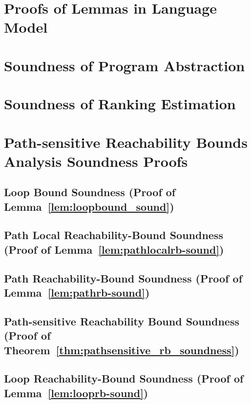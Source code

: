 \section{Proofs of Lemmas in Language Model}
\label{apdx:lem_language}

\clearpage
\section{Soundness of Program Abstraction}
\label{apdx:abs_sound}

\clearpage
\section{Soundness of Ranking Estimation}
\label{apdx:pathinsensitive_rb_soundness}

\clearpage

\section{Path-sensitive Reachability Bounds Analysis Soundness Proofs}
\label{apdx:pathsensitive_rb_soundness}

\subsection{Loop Bound Soundness (Proof of Lemma~\ref{lem:loopbound_sound})}
\label{apdx:loopbound-sound}

\clearpage

\subsection{Path Local Reachability-Bound Soundness (Proof of Lemma~\ref{lem:pathlocalrb-sound})}
\label{apdx:pathlocalrb-sound}

\clearpage

\subsection{Path Reachability-Bound Soundness (Proof of Lemma~\ref{lem:pathrb-sound})}
\label{apdx:pathrb-sound}

\clearpage

\subsection{Path-sensitive Reachability Bound Soundness (Proof of Theorem~\ref{thm:pathsensitive_rb_soundness})}
\label{apdx:psrb-sound}

\clearpage

\subsection{Loop Reachability-Bound Soundness (Proof of Lemma~\ref{lem:looprb-sound})}
\label{apdx:looprb-sound}

\clearpage

